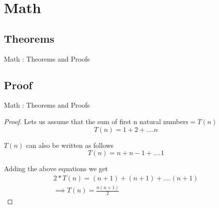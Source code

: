 \documentclass{beamer}
\begin{document}
\section{Math} %
\subsection{Theorems}
\begin{frame}[label=Theorems]{Math : Theorems and Proofs}
    
    \begin{theorem}
    \end{theorem}
    
    \begin{theorem}
    \end{theorem}
\end{frame}



\subsection{Proof} %
\begin{frame}[label=Proof]{Math : Theorems and Proofs}
\transblindshorizontal
    \pause
    \begin{proof}
        Lets us assume that the sum of first n natural numbers$ = T(n)$
        \begin{equation}
            T(n)= 1 + 2 + .... n
        \end{equation}
        
        $T(n)$ can also be written as follows
        \begin{equation}
            T(n) = n + n-1 + .... 1
        \end{equation}
        
        Adding the above equations we get
        \begin{eqnarray*}
            2*T(n) = (n+1) + (n+1) + .... (n+1) \\
            \implies T(n) = \frac{n(n+1)}{2}
        \end{eqnarray*}
    \end{proof}
\end{frame}
\end{document}
